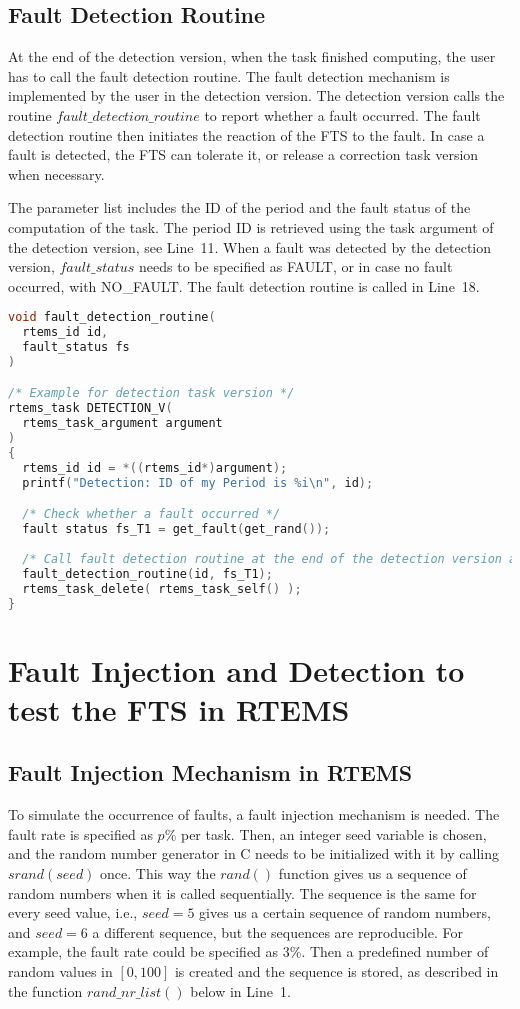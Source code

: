 \subsection{Fault Detection Routine}
At the end of the detection version, when the task finished computing, the user has to call the fault detection routine. The fault detection mechanism is implemented by the user in the detection version. The detection version calls the routine \mbox{$fault\_detection\_routine$} to report whether a fault occurred. The fault detection routine then initiates the reaction of the FTS to the fault. In case a fault is detected, the FTS can tolerate it, or release a correction task version when necessary. 

The parameter list includes the ID of the period and the fault status of the computation of the task. The period ID is retrieved using the task argument of the detection version, see Line~11. When a fault was detected by the detection version, $fault\_status$ needs to be specified as \mbox{FAULT}, or in case no fault occurred, with \mbox{NO\_FAULT}. The fault detection routine is called in Line~18.
\begin{lstlisting}[language=C]
void fault_detection_routine(
  rtems_id id,
  fault_status fs
)

/* Example for detection task version */
rtems_task DETECTION_V(
  rtems_task_argument argument
)
{
  rtems_id id = *((rtems_id*)argument);
  printf("Detection: ID of my Period is %i\n", id);

  /* Check whether a fault occurred */  
  fault status fs_T1 = get_fault(get_rand());
  
  /* Call fault detection routine at the end of the detection version activity */
  fault_detection_routine(id, fs_T1);
  rtems_task_delete( rtems_task_self() );
}
\end{lstlisting}

\section{Fault Injection and Detection to test the FTS in RTEMS}

\subsection{Fault Injection Mechanism in RTEMS}
To simulate the occurrence of faults, a fault injection mechanism is needed. The fault rate is specified as $p\%$ per task. Then, an integer seed variable is chosen, and the random number generator in C needs to be initialized with it by calling $srand(seed)$ once. This way the $rand()$ function gives us a sequence of random numbers when it is called sequentially. The sequence is the same for every seed value, i.e., $seed = 5$ gives us a certain sequence of random numbers, and $seed = 6$ a different sequence, but the sequences are reproducible.
For example, the fault rate could be specified as $3\%$. Then a predefined number of random values in $[0,100]$ is created and the sequence is stored, as described in the function $rand\_nr\_list()$ below in Line~1.

